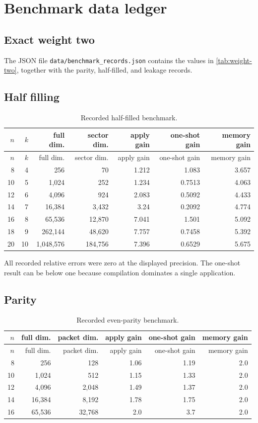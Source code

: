 \chapter{Benchmark data ledger}
\label{app:benchmark-ledger}

\section{Exact weight two}
The JSON file \texttt{data/benchmark\_records.json} contains the values in \cref{tab:weight-two}, together with the parity, half-filled, and leakage records.

\section{Half filling}
\begin{longtable}{@{}rrrrrrr@{}}
\caption{Recorded half-filled benchmark.}\\
\toprule
$n$ & $k$ & full dim. & sector dim. & apply gain & one-shot gain & memory gain\\
\midrule
\endfirsthead
\toprule
$n$ & $k$ & full dim. & sector dim. & apply gain & one-shot gain & memory gain\\
\midrule
\endhead
8 & 4 & 256 & 70 & 1.212 & 1.083 & 3.657\\
10 & 5 & 1,024 & 252 & 1.234 & 0.7513 & 4.063\\
12 & 6 & 4,096 & 924 & 2.083 & 0.5092 & 4.433\\
14 & 7 & 16,384 & 3,432 & 3.24 & 0.2092 & 4.774\\
16 & 8 & 65,536 & 12,870 & 7.041 & 1.501 & 5.092\\
18 & 9 & 262,144 & 48,620 & 7.757 & 0.7458 & 5.392\\
20 & 10 & 1,048,576 & 184,756 & 7.396 & 0.6529 & 5.675\\
\bottomrule
\end{longtable}

All recorded relative errors were zero at the displayed precision. The one-shot result can be below one because compilation dominates a single application.

\section{Parity}
\begin{longtable}{@{}rrrrrr@{}}
\caption{Recorded even-parity benchmark.}\\
\toprule
$n$ & full dim. & packet dim. & apply gain & one-shot gain & memory gain\\
\midrule
\endfirsthead
\toprule
$n$ & full dim. & packet dim. & apply gain & one-shot gain & memory gain\\
\midrule
\endhead
8 & 256 & 128 & 1.06 & 1.19 & 2.0\\
10 & 1,024 & 512 & 1.15 & 1.33 & 2.0\\
12 & 4,096 & 2,048 & 1.49 & 1.37 & 2.0\\
14 & 16,384 & 8,192 & 1.78 & 1.75 & 2.0\\
16 & 65,536 & 32,768 & 2.0 & 3.7 & 2.0\\
\bottomrule
\end{longtable}

